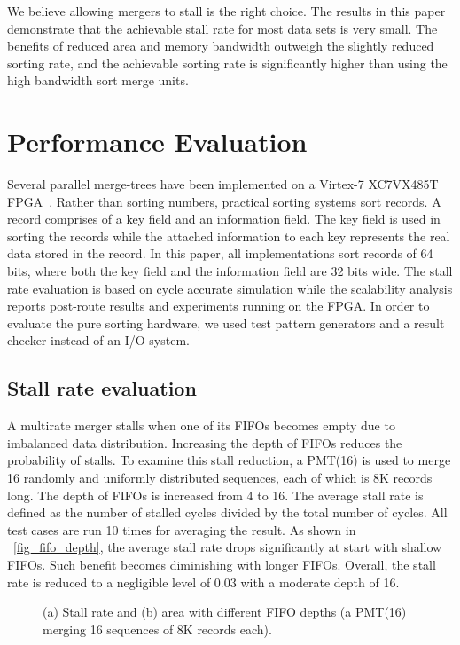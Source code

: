 \documentclass[10pt, conference]{IEEEtran}
\begin{document}
We believe allowing mergers to stall is the right choice.
The results in this paper demonstrate that the achievable stall rate for most data sets is very small.
The benefits of reduced area and memory bandwidth outweigh the slightly reduced sorting rate,
and the achievable sorting rate is significantly higher than using the high bandwidth sort merge units.

\section{Performance Evaluation}

Several parallel merge-trees have been implemented on a Virtex-7 XC7VX485T FPGA~\cite{virtex72015}.
Rather than sorting numbers, practical sorting systems sort records.
A record comprises of a key field and an information field.
The key field is used in sorting the records while the attached information to each key represents the real data stored in the record.
In this paper, all implementations sort records of 64 bits, where both the key field and the information field are 32 bits wide.
The stall rate evaluation is based on cycle accurate simulation
while the scalability analysis reports post-route results and experiments running on the FPGA.
In order to evaluate the pure sorting hardware, we used test pattern generators and a result checker instead of an I/O system.

\subsection{Stall rate evaluation}\label{sec_stall_rate_ana}

A multirate merger stalls when one of its FIFOs becomes empty due to imbalanced data distribution.
Increasing the depth of FIFOs reduces the probability of stalls.
To examine this stall reduction, a PMT(16) is used to merge 16 randomly and uniformly distributed sequences, each of which is 8K records long.
The depth of FIFOs is increased from 4 to 16.
The average stall rate is defined as the number of stalled cycles divided by the total number of cycles.
All test cases are run 10 times for averaging the result.
As shown in \figurename~\ref{fig_fifo_depth}, the average stall rate drops significantly at start with shallow FIFOs.
Such benefit becomes diminishing with longer FIFOs. 
Overall, the stall rate is reduced to a negligible level of 0.03 with a moderate depth of 16.

\begin{figure}[bt]
\caption{(a) Stall rate and (b) area with different FIFO depths (a PMT(16) merging 16 sequences of 8K records each).}\label{fig_fifo_cfg}
\end{figure}
\end{document}
